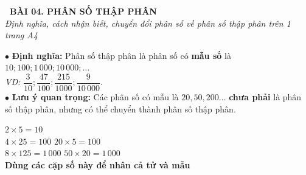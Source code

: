 \documentclass[14pt,a4paper,oneside]{extbook}
\begin{document}
\noindent
\begin{tcolorbox}[
  enhanced,
  colback=teal!8!white,
  colframe=teal!80!black,
  arc=3mm,
  boxrule=1.1pt,
  width=\linewidth,
  halign=center,
  top=2.2mm, bottom=2.2mm,
  left=3mm, right=3mm,
  drop fuzzy shadow
]
  {\large\bfseries\color{teal!95!black}\faBookmark\ BÀI 04. PHÂN SỐ THẬP PHÂN}\\[2pt]
  {\scriptsize\color{black!75}\itshape Định nghĩa, cách nhận biết, chuyển đổi phân số về phân số thập phân trên 1 trang A4}
\end{tcolorbox}

\vspace{3.2mm}
\noindent
\begin{minipage}[t]{0.56\textwidth}
  \begin{tcolorbox}[
    enhanced,
    title={\footnotesize\bfseries\color{white}\faKey\ 1. Khái niệm phân số thập phân},
    colback=blue!2!white,
    colframe=blue!75!black,
    arc=2.5mm, boxrule=0.8pt, top=1.8mm, bottom=1.8mm, left=2.2mm, right=2.2mm
  ]
    \footnotesize
    $\bullet$ \textbf{Định nghĩa:} Phân số thập phân là phân số có \textbf{mẫu số} là $10; 100; 1\,000; 10\,000; \dots$\\
    \textit{VD:} $\dfrac{3}{10}; \dfrac{47}{100}; \dfrac{215}{1000}; \dfrac{9}{10\,000}$.\\[2pt]
    $\bullet$ \textbf{Lưu ý quan trọng:} Các phân số có mẫu là $20, 50, 200\dots$ \textbf{chưa phải} là phân số thập phân, nhưng có thể chuyển thành phân số thập phân.
  \end{tcolorbox}
\end{minipage}%
\hfill
\begin{minipage}[t]{0.42\textwidth}
  \begin{tcolorbox}[
    enhanced,
    title={\footnotesize\bfseries\color{white}\faExchange\ 2. Cặp số tạo ra $10, 100, 1000$},
    colback=teal!2!white,
    colframe=teal!75!black,
    arc=2.5mm, boxrule=0.8pt, top=1.8mm, bottom=1.8mm, left=2mm, right=2mm,
    halign=center
  ]
    \footnotesize
    $2 \times 5 = 10$\\[2pt]
    $4 \times 25 = 100$ \quad $20 \times 5 = 100$\\[2pt]
    $8 \times 125 = 1\,000$ \quad $50 \times 20 = 1\,000$\\[3pt]
    {\tiny\color{teal!90!black}\bfseries Dùng các cặp số này để nhân cả tử và mẫu}
  \end{tcolorbox}
\end{minipage}
\end{document}
